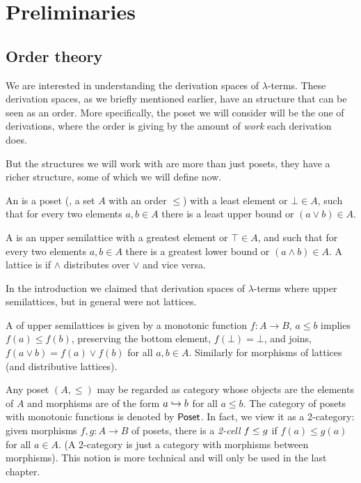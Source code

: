 
\chapter{Preliminaries}

\section{Order theory}
We are interested in understanding the derivation spaces
of $\lambda$-terms.
These derivation spaces, as we briefly mentioned earlier, have an structure that can be seen as an order.
More specifically, the poset we will consider will be the one of derivations, where the order is giving by
the amount of \textit{work} each derivation does.

But the structures we will work with are more than just posets, they have a richer structure,
some of which we will define now.

An  is a poset (\ie, a set $A$ with an order $\leq$)
with a least element or  $\bot \in A$,
such that for every two elements $a, b \in A$
there is a least upper bound or  $(a \lor b) \in A$.


A  is an upper semilattice
with a greatest element or  $\top \in A$,
and such that for every two elements $a, b \in A$
there is a greatest lower bound or  $(a \land b) \in A$.
A lattice is  if $\land$ distributes over $\lor$ and vice versa.

In the introduction we claimed that derivation spaces of $\lambda$-terms where
upper semilattices, but in general were not lattices.

A  of upper semilattices
is given by a monotonic function $f : A \to B$,
\ie $a \leq b$ implies $f(a) \leq f(b)$,
preserving the bottom element, \ie $f(\bot) = \bot$,
and joins, \ie $f(a \lor b) = f(a) \lor f(b)$ for all $a, b \in A$.
Similarly for morphisms of lattices (and distributive lattices).

Any poset $(A,\leq)$ may be regarded as category whose objects are the elements of $A$
and morphisms are of the form $\pt{b}{a}$ for all $a \leq b$. 
The category of posets with monotonic functions is denoted by $\Poset$.
In fact, we view it as a 2-category:
given morphisms $f,g : A \to B$ of posets,
there is a \textit{2-cell} $f \totwocell g$ if $f(a) \leq g(a)$ for all $a \in A$.
(A 2-category is just a category with morphisms between morphisms).
This notion is more technical and will only be used in the last chapter.


